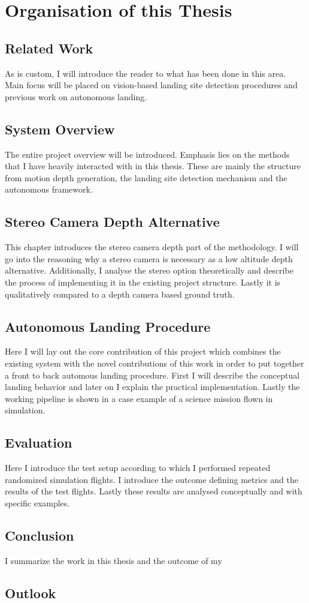 \section{Organisation of this Thesis}
\subsection{Related Work}
As is custom, I will introduce the reader to what has been done in this area. Main focus will be placed on vision-based landing site detection procedures and previous work on autonomous landing.
\subsection{System Overview}
The entire project overview will be introduced. Emphasis lies on the methods that I have heavily interacted with in this thesis. These are mainly the structure from motion depth generation, the landing site detection mechanism and the autonomous framework.
\subsection{Stereo Camera Depth Alternative}
This chapter introduces the stereo camera depth part of the methodology. I will go into the reasoning why a stereo camera is necessary as a low altitude depth alternative. Additionally, I analyse the stereo option theoretically and describe the process of implementing it in the existing project structure. Lastly it is qualitatively compared to a depth camera based ground truth.
\subsection{Autonomous Landing Procedure}
Here I will lay out the core contribution of this project which combines the existing system with the novel contributions of this work in order to put together a front to back automous landing procedure. First I will describe the conceptual landing behavior and later on I explain the practical implementation. Lastly the working pipeline is shown in a case example of a science mission flown in simulation.
\subsection{Evaluation}
Here I introduce the test setup according to which I performed repeated randomized simulation flights. I introduce the outcome defining metrics and the results of the test flights. Lastly these results are analysed conceptually and with specific examples. %
\subsection{Conclusion}
I summarize the work in this thesis and the outcome of my 
\subsection{Outlook}